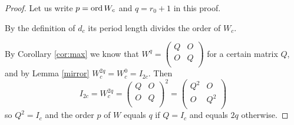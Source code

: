 \begin{proof}
  Let us write $p=\operatorname{ord} W_c$ and $q=r_0+1$ in this proof.

By the definition of $d_c$ its period length divides the order of $W_c$.

  By Corollary \ref{cor:max} we know that 
  $W^{q}=\left(\begin{smallmatrix} Q & O \\ O & Q \\\end{smallmatrix}\right)$
	  for a certain matrix $Q$, and by Lemma \ref{mirror}
	  $W_c^{2q}=W_c^0=I_{2c}$.
  Then
  \[
  I_{2c}=W_{c}^{2q}
  =
  \left(\begin{matrix} Q & O \\ O & Q \\ \end{matrix} \right)^{2}
  =
  \left(\begin{matrix} Q^{2} & O \\ O & Q^{2} \\ \end{matrix} \right)
  \]
  so $Q^{2}=I_c$ and the order $p$ of $W$ equals $q$ if $Q=I_c$
and equals $2q$ otherwise.
\end{proof}

